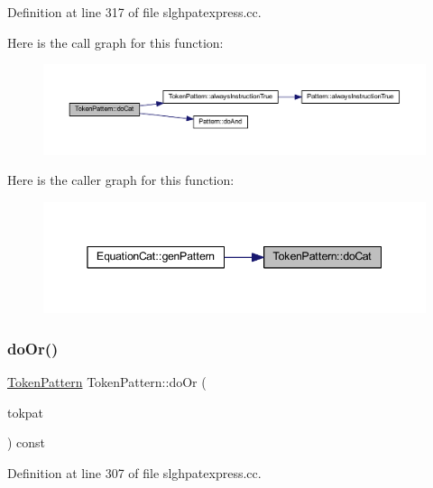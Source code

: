 Definition at line 317 of file slghpatexpress.\+cc.

Here is the call graph for this function\+:
\nopagebreak
\begin{figure}[H]
\begin{center}
\leavevmode
\includegraphics[width=350pt]{class_token_pattern_adaf0fe329004ab5e975f4d2772fc016e_cgraph}
\end{center}
\end{figure}
Here is the caller graph for this function\+:
\nopagebreak
\begin{figure}[H]
\begin{center}
\leavevmode
\includegraphics[width=345pt]{class_token_pattern_adaf0fe329004ab5e975f4d2772fc016e_icgraph}
\end{center}
\end{figure}
\mbox{\label{class_token_pattern_a9e4586d96306831e4c54930aa4097756}} 
\subsubsection{\texorpdfstring{doOr()}{doOr()}}
{\footnotesize\ttfamily \mbox{\hyperlink{class_token_pattern}{Token\+Pattern}} Token\+Pattern\+::do\+Or (\begin{DoxyParamCaption}\item[{const \mbox{\hyperlink{class_token_pattern}{Token\+Pattern}} \&}]{tokpat }\end{DoxyParamCaption}) const}



Definition at line 307 of file slghpatexpress.\+cc.

